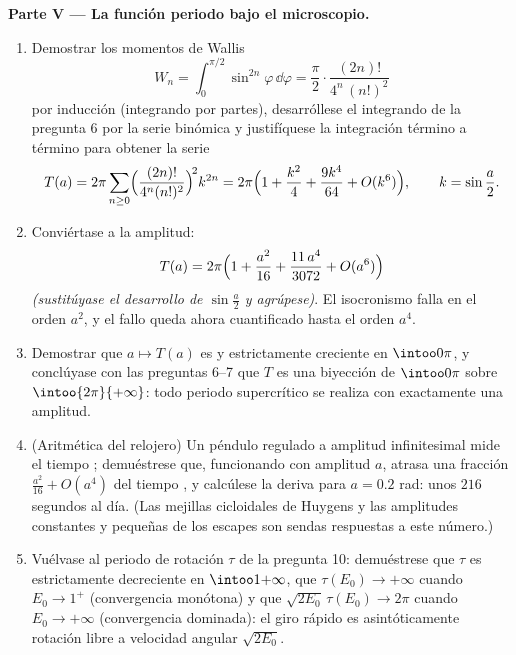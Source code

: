 \begin{problem}
\medskip
\noindent\textbf{Parte V --- La función periodo bajo el microscopio.}
\begin{enumerate}[resume]
  \item Demostrar los momentos de Wallis
        \[
        W_n = \int_0^{\pi/2}\sin^{2n}\varphi\,\dd\varphi
        = \frac\pi2\cdot\frac{(2n)!}{4^n\,(n!)^2}
        \]
        por inducción (integrando por partes), desarróllese el
        integrando de la pregunta 6 por la serie binómica y justifíquese
        la integración término a término para obtener la serie 
        \[
        T(a) = 2\pi\sum_{n\geq0}
        \Bigl(\frac{(2n)!}{4^n(n!)^2}\Bigr)^{\!2}k^{2n}
        = 2\pi\Bigl(1 + \frac{k^2}4 + \frac{9k^4}{64}
        + O(k^6)\Bigr),
        \qquad k = \sin\frac a2 .
        \]
  \item Conviértase a la amplitud:
        \[
        T(a) = 2\pi\Bigl(1 + \frac{a^2}{16} +
        \frac{11\,a^4}{3072} + O(a^6)\Bigr)
        \]
        \emph{(sustitúyase el desarrollo de $\sin\frac a2$ y agrúpese)}.
        El isocronismo falla en el orden $a^2$, y el fallo queda ahora
        cuantificado hasta el orden $a^4$. \item Demostrar que
        $a \mapsto T(a)$ es
         y estrictamente
        creciente en $\intoo0\pi$, y conclúyase con las preguntas 6--7
        que $T$ es una biyección de $\intoo0\pi$ sobre
        $\intoo{2\pi}{+\infty}$: todo periodo supercrítico se realiza
        con exactamente una amplitud. \item (Aritmética del relojero) Un
        péndulo regulado a amplitud infinitesimal mide el tiempo
        ; demuéstrese que, funcionando
        con amplitud $a$, atrasa una fracción $\frac{a^2}{16} + O(a^4)$
        del tiempo , y calcúlese la
        deriva para $a = 0.2$ rad: unos $216$ segundos al día. (Las
        mejillas cicloidales de Huygens y las amplitudes constantes y
        pequeñas de los escapes son sendas respuestas a este número.)
        \item Vuélvase al periodo de rotación $\tau$ de la pregunta 10:
        demuéstrese que $\tau$ es estrictamente decreciente en
        $\intoo1{+\infty}$, que $\tau(E_0) \to +\infty$ cuando
        $E_0 \to 1^+$ (convergencia monótona) y que
        $\sqrt{2E_0}\,\tau(E_0) \to 2\pi$ cuando $E_0 \to
        +\infty$ (convergencia dominada): el giro rápido es
        asintóticamente rotación libre a velocidad angular
        $\sqrt{2E_0}$.
\end{enumerate}


\end{problem}
